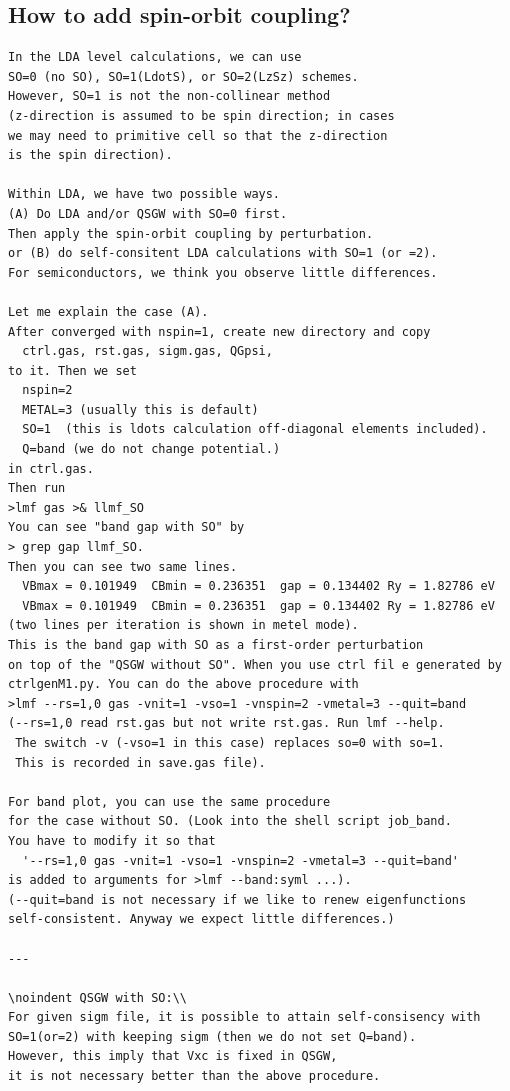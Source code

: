 \subsection{How to add spin-orbit coupling?}
\begin{verbatim}
In the LDA level calculations, we can use
SO=0 (no SO), SO=1(LdotS), or SO=2(LzSz) schemes.
However, SO=1 is not the non-collinear method
(z-direction is assumed to be spin direction; in cases
we may need to primitive cell so that the z-direction
is the spin direction).

Within LDA, we have two possible ways.
(A) Do LDA and/or QSGW with SO=0 first.
Then apply the spin-orbit coupling by perturbation.
or (B) do self-consitent LDA calculations with SO=1 (or =2).
For semiconductors, we think you observe little differences.

Let me explain the case (A).
After converged with nspin=1, create new directory and copy
  ctrl.gas, rst.gas, sigm.gas, QGpsi,
to it. Then we set
  nspin=2 
  METAL=3 (usually this is default)
  SO=1  (this is ldots calculation off-diagonal elements included).
  Q=band (we do not change potential.)
in ctrl.gas. 
Then run
>lmf gas >& llmf_SO
You can see "band gap with SO" by 
> grep gap llmf_SO.
Then you can see two same lines.
  VBmax = 0.101949  CBmin = 0.236351  gap = 0.134402 Ry = 1.82786 eV
  VBmax = 0.101949  CBmin = 0.236351  gap = 0.134402 Ry = 1.82786 eV
(two lines per iteration is shown in metel mode).
This is the band gap with SO as a first-order perturbation 
on top of the "QSGW without SO". When you use ctrl fil e generated by
ctrlgenM1.py. You can do the above procedure with
>lmf --rs=1,0 gas -vnit=1 -vso=1 -vnspin=2 -vmetal=3 --quit=band
(--rs=1,0 read rst.gas but not write rst.gas. Run lmf --help.
 The switch -v (-vso=1 in this case) replaces so=0 with so=1. 
 This is recorded in save.gas file).

For band plot, you can use the same procedure 
for the case without SO. (Look into the shell script job_band.
You have to modify it so that 
  '--rs=1,0 gas -vnit=1 -vso=1 -vnspin=2 -vmetal=3 --quit=band' 
is added to arguments for >lmf --band:syml ...).
(--quit=band is not necessary if we like to renew eigenfunctions
self-consistent. Anyway we expect little differences.)

---

\noindent QSGW with SO:\\
For given sigm file, it is possible to attain self-consisency with SO=1(or=2) with keeping sigm (then we do not set Q=band). 
However, this imply that Vxc is fixed in QSGW, 
it is not necessary better than the above procedure.
\end{verbatim}


